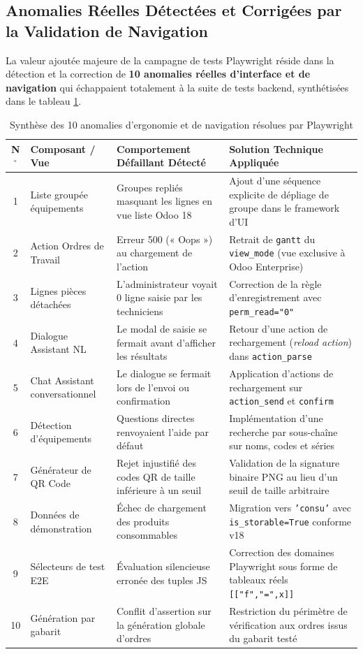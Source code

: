 \subsection{Anomalies Réelles Détectées et Corrigées par la Validation de Navigation}
La valeur ajoutée majeure de la campagne de tests Playwright réside dans la détection et la correction de \textbf{10 anomalies réelles d'interface et de navigation} qui échappaient totalement à la suite de tests backend, synthétisées dans le tableau \ref{tab:e2e_bugs}.

\begin{table}[!ht]
\centering
\small
\renewcommand{\arraystretch}{1.18}
\begin{tabularx}{\textwidth}{c p{3.6cm} p{4.2cm} X}
\toprule
\textbf{N$^\circ$} & \textbf{Composant / Vue} & \textbf{Comportement Défaillant Détecté} & \textbf{Solution Technique Appliquée} \\
\midrule
1 & Liste groupée équipements & Groupes repliés masquant les lignes en vue liste Odoo 18 & Ajout d'une séquence explicite de dépliage de groupe dans le framework d'UI \\
2 & Action Ordres de Travail & Erreur 500 (« Oops ») au chargement de l'action & Retrait de \texttt{gantt} du \texttt{view\_mode} (vue exclusive à Odoo Enterprise) \\
3 & Lignes pièces détachées & L'administrateur voyait 0 ligne saisie par les techniciens & Correction de la règle d'enregistrement avec \texttt{perm\_read="0"} \\
4 & Dialogue Assistant NL & Le modal de saisie se fermait avant d'afficher les résultats & Retour d'une action de rechargement (\textit{reload action}) dans \texttt{action\_parse} \\
5 & Chat Assistant conversationnel & Le dialogue se fermait lors de l'envoi ou confirmation & Application d'actions de rechargement sur \texttt{action\_send} et \texttt{confirm} \\
6 & Détection d'équipements & Questions directes renvoyaient l'aide par défaut & Implémentation d'une recherche par sous-chaîne sur noms, codes et séries \\
7 & Générateur de QR Code & Rejet injustifié des codes QR de taille inférieure à un seuil & Validation de la signature binaire PNG au lieu d'un seuil de taille arbitraire \\
8 & Données de démonstration & Échec de chargement des produits consommables & Migration vers \texttt{'consu'} avec \texttt{is\_storable=True} conforme v18 \\
9 & Sélecteurs de test E2E & Évaluation silencieuse erronée des tuples JS & Correction des domaines Playwright sous forme de tableaux réels \texttt{[["f","=",x]]} \\
10 & Génération par gabarit & Conflit d'assertion sur la génération globale d'ordres & Restriction du périmètre de vérification aux ordres issus du gabarit testé \\
\bottomrule
\end{tabularx}
\caption{Synthèse des 10 anomalies d'ergonomie et de navigation résolues par Playwright}
\label{tab:e2e_bugs}
\end{table}

